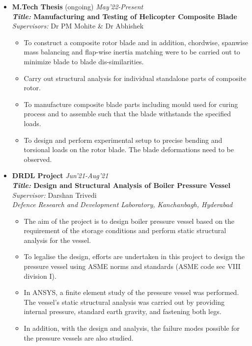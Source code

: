 \documentclass[10pt,article]{article}
\newcommand{\resheading}[1]{{\noindent \large \colorbox{mygrey} { \begin{minipage}{0.99\textwidth}\centering{\textbf{#1 \vphantom{p\^{E}}}}\end{minipage}}}}
\begin{document}
\resheading{PROJECTS}
\begin{itemize}
\setlength\itemsep{-0.2em}
\item \textbf{M.Tech Thesis} (ongoing) \hfill \textit{May'22-Present}\\
\textbf{\textit{Title:} Manufacturing and Testing of Helicopter Composite Blade}\\
\textit{Supervisors:} Dr PM Mohite \& Dr Abhishek
\vspace{-2mm}
\begin{itemize}
    \item To construct a composite rotor blade and in addition, chordwise, spanwise mass balancing and flap-wise inertia matching were to be carried out to minimize blade to blade dis-similarities.
    \item Carry out structural analysis for individual standalone parts of composite rotor.
    \item To manufacture composite blade parts including mould used for curing process and to assemble such that the blade withstands the specified loads.
    \item To design and perform experimental setup to precise bending and torsional loads on the rotor blade. The blade deformations need to be observed.
\end{itemize}

\item \textbf{DRDL Project} \hfill \textit{Jun'21-Aug'21}\\
\textbf{\textit{Title:} Design and Structural Analysis of Boiler Pressure Vessel}\\
\textit{Supervisor:} Darshan Trivedi \\
\textit{Defence Research and Development Laboratory, Kanchanbagh, Hyderabad}
\vspace{-2mm}
\begin{itemize}
    \item The aim of the project is to design boiler pressure vessel based on the requirement of the storage conditions and perform static structural analysis for the vessel. 
    \item To legalise the design, efforts are undertaken in this project to design the pressure vessel using ASME norms and standards (ASME code sec VIII division I).
    \item In ANSYS, a finite element study of the pressure vessel was performed. The vessel's static structural analysis was carried out by providing internal pressure, standard earth gravity, and fastening both legs.
    \item In addition, with the design and analysis, the failure modes possible for the pressure vessels are also studied.
\end{itemize}


\end{itemize}
\end{document}
